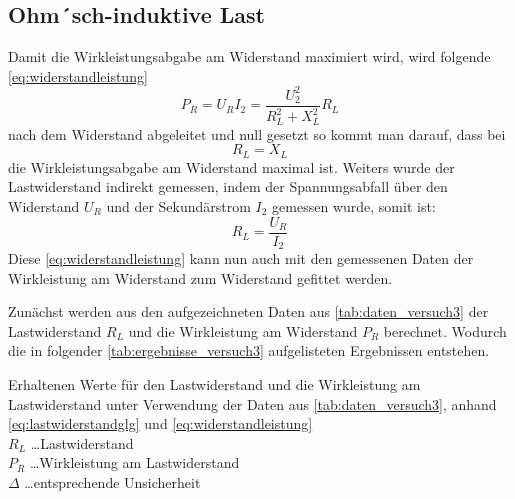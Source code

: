 \documentclass[11pt,ngerman]{scrartcl}
\begin{document}
\subsection{Ohm´sch-induktive Last}

Damit die Wirkleistungsabgabe am Widerstand maximiert wird, wird folgende \autoref{eq:widerstandleistung}
\begin{equation}
	P_R = U_R I_2 =  \frac{U_2^2}{R_L^2 + X_L^2} R_L
	\label{eq:widerstandleistung}
\end{equation}
nach dem Widerstand abgeleitet und null gesetzt so kommt man darauf, dass bei
\begin{equation}
	R_L = X_L
	\label{eq:}
\end{equation}
die Wirkleistungsabgabe am Widerstand maximal ist. Weiters wurde der
Lastwiderstand indirekt gemessen, indem der Spannungsabfall über den
Widerstand $U_R$ und der Sekundärstrom $I_2$ gemessen wurde, somit ist:
\begin{equation}
	R_L = \frac{U_R}{I_2}
	\label{eq:lastwiderstandglg}
\end{equation}
Diese \autoref{eq:widerstandleistung} kann nun auch mit den gemessenen Daten
der Wirkleistung am Widerstand zum Widerstand gefittet werden.

Zunächst werden aus den aufgezeichneten Daten aus \autoref{tab:daten_versuch3} der
Lastwiderstand $R_L$ und die Wirkleistung am Widerstand $P_R$ berechnet. Wodurch die in folgender
\autoref{tab:ergebnisse_versuch3} aufgelisteten Ergebnissen entstehen.


\begin{table}[H]
	\caption{Erhaltenen Werte für den Lastwiderstand
		und die Wirkleistung am Lastwiderstand unter Verwendung der Daten aus
		\autoref{tab:daten_versuch3}, anhand \autoref{eq:lastwiderstandglg}
		und \autoref{eq:widerstandleistung}  \\
		$R_L$ \dots Lastwiderstand \\
		$P_R$ \dots Wirkleistung am Lastwiderstand \\
		$\Delta$ \dots entsprechende Unsicherheit
	}
	\label{tab:ergebnisse_versuch3}
	\begin{center}
		
	\end{center}
\end{table}
\end{document}
